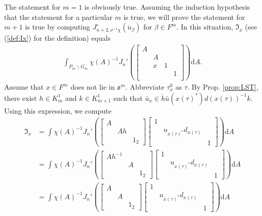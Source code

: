 \documentclass[11pt]{amsart}
\newcommand\oo{\mathfrak{o}}
\newcommand\If{\mathfrak{I}}
\newcommand\dr{\mathrm{d}}
\newcommand\1{\mathbf{1}}
\newcommand\ac{\acute}
\newcommand\bs{\backslash}%
\newcommand\bu{\bar{u}}
\numberwithin{equation}{section}
\begin{document}
The statement for $m =  1$ is obviously true.
Assuming the induction hypothesis that the statement for a particular $m$ is true, we will prove the statement for $m+1$ is true by computing $J_{n+2,\nu^{-1}\chi}^\circ(\ac{u}_\beta)$ for $\beta \in F^m$.
In this situation, $\If_x$ (see (\ref{def:Ix}) for the definition) equals
\begin{align*}
\int_{P_m \bs G_{m}} \chi(A)^{-1} J_n'(\begin{bmatrix}
A & & &  \\
&A & & \\
& x & 1 &  \\
& & &1  \\
\end{bmatrix}) \dr A.
\end{align*} 
Assume that $x \in F^m$ does not lie in $\oo^m$.
Abbreviate $\tau_x^0$ as $\tau$.
By Prop. \ref{prop:LST}, there exist $h \in K^1_m$ and $k \in K^1_{m+1}$ such that $\bu_{x} \in \ac{h} \bu(x(\tau)^*) d(x(\tau))^{-1}k$.
Using this expression, we compute
\begin{align*}
\If_x &= \int \chi(A)^{-1} J_n'(
\begin{bmatrix}
A& &  \\
&A h&  \\
& & 1_2
\end{bmatrix}
\begin{bmatrix}
1& &  \\
&u_{x(\tau)^*} d_{x(\tau)} &  \\
& & 1
\end{bmatrix}) \dr A \\
&= \int \chi(A)^{-1} J_n'(
\begin{bmatrix}
A h^{-1} & &  \\
&A &  \\
& &1_2 
\end{bmatrix}
\begin{bmatrix}
1& &  \\
&u_{x(\tau)^*} d_{x(\tau)} &  \\
& & 1
\end{bmatrix}) \dr A \\
&= \int \chi(A)^{-1} J_n'(
\begin{bmatrix}
A & &  \\
&A &  \\
& &1_2 
\end{bmatrix}
\begin{bmatrix}
1& &  \\
&u_{x(\tau)^*} d_{x(\tau)} &  \\
& & 1
\end{bmatrix}) \dr A
\end{align*} 
\end{document}

